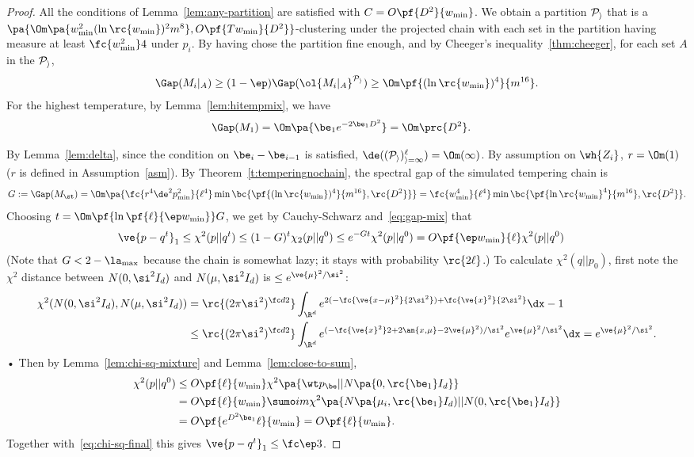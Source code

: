 \begin{proof}
All the conditions of Lemma~\ref{lem:any-partition} are satisfied with $C=O\pf{D^2}{w_{\min}}$. We obtain a partition $\cal P_i$ that is a 
$
\pa{\Om\pa{w_{\min}^2(\ln \rc{w_{\min}})^2{m^8}}, O\pf{Tw_{\min}}{D^2}}
$-clustering under the projected chain with each set in the partition having measure at least $\fc{w_{\min}^2}4$ under $p_i$. 
By having chose the partition fine enough, and by Cheeger's inequality~\ref{thm:cheeger}, for each set $A$ in the $\cal P_i$, 
\begin{align}
\Gap(M_{i}|_A)\ge 
(1-\ep)
\Gap(\ol{M_{i}|_{A}}^{\cal P_i})\ge \Om\pf{(\ln \rc{w_{\min}})^4}{m^{16}}.
\end{align}
For the highest temperature, by Lemma~\ref{lem:hitempmix}, we have
\begin{align}
\Gap(M_1) &=\Om\pa{ \be_1 e^{-2\be_1 D^2}} = \Om\prc{D^2}. 
\end{align}

By Lemma~\ref{lem:delta}, since the condition on $\be_i-\be_{i-1}$ is satisfied, $\de((\cal P_i)_{i=1}^\ell)=\Om(1)$. By assumption on $\wh{Z_i}$, $r=\Om(1)$ ($r$ is defined in Assumption~\ref{asm}). 
By Theorem~\ref{t:temperingnochain}, the spectral gap of the simulated tempering chain is
\begin{align}
G:=\Gap(M_{\st}) = \Om\pa{\fc{r^4\de^2p_{\min}^2}{\ell^4}\min\bc{\pf{(\ln \rc{w_{\min}})^4}{m^{16}}, \rc{D^2}}} = \fc{w_{\min}^4}{\ell^4}\min\bc{\pf{{\ln \rc{w_{\min}}}^4}{m^{16}}, \rc{D^2}}.
\end{align}
Choosing $t=\Om\pf{\ln \pf{\ell}{\ep w_{\min}}}G$, we get by Cauchy-Schwarz and~\eqref{eq:gap-mix} that 
\begin{align}\label{eq:chi-sq-final}
\ve{p-q^t}_1&\le \chi^2(p||q^t)\le  (1-G)^t\chi_2(p||q^0) \le e^{-Gt}\chi^2(p||q^0)
=O\pf{\ep w_{\min}}{\ell}\chi^2(p||q^0)
\end{align}
(Note that $G<2-\la_{\max}$ because the chain is somewhat lazy; it stays with probability $\rc{2\ell}$.)
To calculate $\chi^2(q||p_0)$, first note the $\chi^2$ distance between $N(0,\si^2I_d)$ and $N(\mu, \si^2I_d)$ is $\le e^{\ve{\mu}^2/\si^2}$:
\begin{align}
\chi^2(N(0,\si^2I_d), N(\mu,\si^2 I_d))& = \rc{(2\pi\si^2)^{\fc d2}}\int_{\R^d} e^{2(-\fc{\ve{x-\mu}^2}{2\si^2}) + \fc{\ve{x}^2}{2\si^2}}\dx-1\\
&\le \rc{(2\pi\si^2)^{\fc d2}}\int_{\R^d}  e^{(-\fc{\ve{x}^2}2 + 2\an{x,\mu} - 2\ve{\mu}^2)/\si^2} e^{\ve{\mu}^2/\si^2}\dx= e^{\ve{\mu}^2/\si^2}. 
\end{align}•
Then by Lemma~\ref{lem:chi-sq-mixture} and Lemma~\ref{lem:close-to-sum},
\begin{align}
\chi^2(p||q^0) &\le O\pf{\ell}{w_{\min}} \chi^2\pa{\wt p_\be||N\pa{0, \rc{\be_1}I_d}} \\
&= O\pf{\ell}{w_{\min}}\sumo im \chi^2\pa{N\pa{\mu_i,\rc{\be_1}I_d)||N(0, \rc{\be_1}I_d}}\\
&= O\pf{e^{D^2\be_1}\ell}{w_{\min}} =O\pf{\ell}{w_{\min}}. 
\end{align}
Together with~\eqref{eq:chi-sq-final} this gives $\ve{p-q^t}_1\le \fc\ep3$.


\end{proof}
